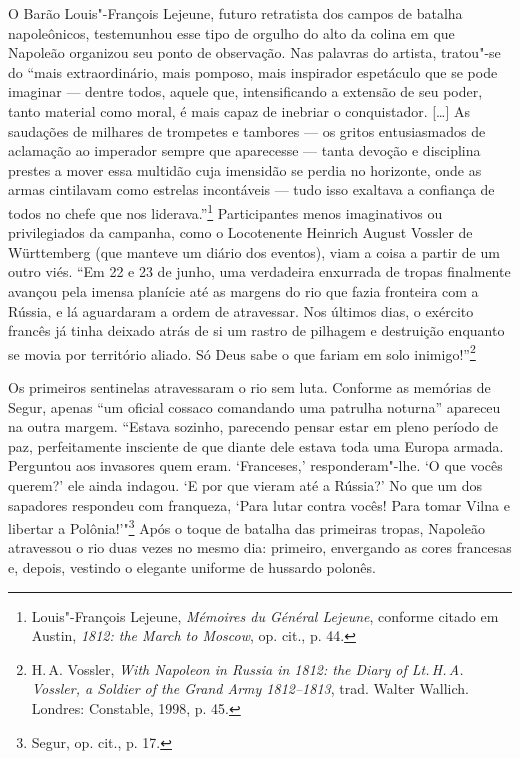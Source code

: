 %

O Barão Louis"-François Lejeune, futuro retratista dos campos de batalha
napoleônicos, testemunhou esse tipo de orgulho do alto da colina em que
Napoleão organizou seu ponto de observação. Nas palavras do artista,
tratou"-se do ``mais extraordinário, mais pomposo, mais inspirador
espetáculo que se pode imaginar --- dentre todos, aquele que,
intensificando a extensão de seu poder, tanto material como moral, é
mais capaz de inebriar o conquistador. [\ldots{}] As saudações de milhares
de trompetes e tambores --- os gritos entusiasmados de aclamação ao
imperador sempre que aparecesse --- tanta devoção e disciplina prestes a
mover essa multidão cuja imensidão se perdia no horizonte, onde as armas
cintilavam como estrelas incontáveis --- tudo isso exaltava a confiança de
todos no chefe que nos liderava.''\footnote{Louis"-François Lejeune, \textit{Mémoires du Général Lejeune}, conforme citado em Austin, \textit{1812: the March to Moscow}, op. cit., p. 44.} Participantes menos imaginativos ou privilegiados da campanha, como o Locotenente
Heinrich August Vossler de Württemberg (que manteve um diário dos
eventos), viam a coisa a partir de um outro viés. ``Em 22 e 23 de junho,
uma verdadeira enxurrada de tropas finalmente avançou pela imensa
planície até as margens do rio que fazia fronteira com a Rússia, e lá
aguardaram a ordem de atravessar. Nos últimos dias, o exército francês
já tinha deixado atrás de si um rastro de pilhagem e destruição enquanto
se movia por território aliado. Só Deus sabe o que fariam em solo
inimigo!''\footnote{H.\,A. Vossler, \textit{With Napoleon in Russia in 1812: the Diary of Lt.\,H.\,A. Vossler, a Soldier of the Grand Army 1812--1813}, trad. Walter Wallich. Londres: Constable, 1998, p. 45.}

Os primeiros sentinelas atravessaram o rio sem luta. Conforme as
memórias de Segur, apenas ``um oficial cossaco comandando uma patrulha
noturna'' apareceu na outra margem. ``Estava sozinho, parecendo pensar
estar em pleno período de paz, perfeitamente insciente de que diante
dele estava toda uma Europa armada. Perguntou aos invasores quem eram.
`Franceses,' responderam"-lhe. `O que vocês querem?' ele ainda indagou.
`E por que vieram até a Rússia?' No que um dos sapadores respondeu com
franqueza, `Para lutar contra vocês! Para tomar Vilna e libertar a
Polônia!'"\footnote{Segur, op. cit., p. 17.} Após o toque de batalha
das primeiras tropas, Napoleão atravessou o rio duas vezes no mesmo dia:
primeiro, envergando as cores francesas e, depois, vestindo o elegante
uniforme de hussardo polonês.

